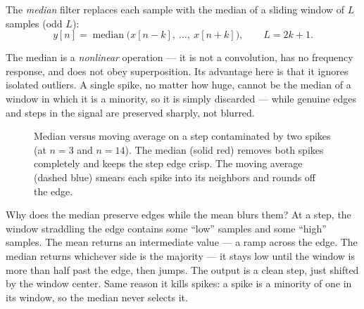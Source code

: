The \emph{median} filter replaces each sample with the median of a sliding window
of $L$ samples (odd $L$):
\begin{equation}
  y[n] = \operatorname{median}\bigl(x[n-k],\ \dots,\ x[n+k]\bigr),
  \qquad L = 2k+1.
  \label{ch17:median-def}
\end{equation}

The median is a \emph{nonlinear} operation --- it is not a convolution, has no
frequency response, and does not obey superposition. Its advantage here
is that it ignores isolated outliers. A single spike, no matter how huge, cannot be
the median of a window in which it is a minority, so it is simply discarded ---
while genuine edges and steps in the signal are preserved sharply, not blurred.

\begin{figure}[H]
\centering
{}
\caption{Median versus moving average on a step contaminated by two spikes (at
$n=3$ and $n=14$). The median (solid red) removes both spikes completely and
keeps the step edge crisp. The moving average (dashed blue) smears each
spike into its neighbors and rounds off the edge.}
\label{ch17:fig-median}
\end{figure}

\begin{whybox}
Why does the median preserve edges while the mean blurs them? At a step, the
window straddling the edge contains some ``low'' samples and some ``high''
samples. The mean returns an intermediate value --- a ramp across the edge. The
median returns whichever side is the majority --- it stays low until the window
is more than half past the edge, then jumps. The output is a clean step, just
shifted by the window center. Same reason it kills spikes: a spike is a minority
of one in its window, so the median never selects it.
\end{whybox}

